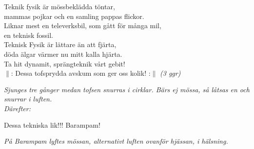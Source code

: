\documentclass[a6paper,10pt,twoside]{article}
\begin{document}
\noindent
\begin{center}
\end{center}
\begin{lyrics}
Teknik fysik är mössbeklädda töntar,\\
mammas pojkar och en samling pappas flickor.\\
Liknar mest en televerksbil, som gått för många mil,\\
en teknisk fossil.
\vspace{5pt}\\
Teknisk Fysik är lättare än att fjärta,\\
döda älgar värmer nu mitt kalla hjärta.\\
Ta hit dynamit, sprängteknik vårt gebit!\\
$\|$: Dessa tofsprydda avskum som ger oss kolik! :$\|$ \textit{(3 ggr)}
\begin{center}
\textit{Sjunges tre gånger medan tofsen snurras i cirklar. Bärs ej mössa, så låtsas en och snurrar i luften.\\Därefter:}
\end{center}
Dessa tekniska lik!!! Barampam!
\begin{center}
\textit{På Barampam lyftes mössan, alternativt luften ovanför hjässan, i hälsning.}
\end{center}
\end{lyrics}
\end{document}
